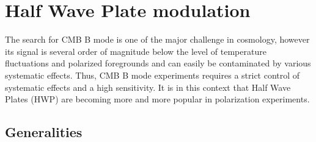 
\section{Half Wave Plate modulation}
\label{sec:hwp}

The search for CMB B mode is one of the major challenge in cosmology, however its signal is several order of magnitude below the level of temperature fluctuations and polarized foregrounds and can easily be contaminated by various systematic effects. Thus, CMB B mode experiments requires a strict control of systematic effects and a high sensitivity. It is in this context that Half Wave Plates (HWP) are becoming more and more popular in polarization experiments.

\subsection{Generalities}



